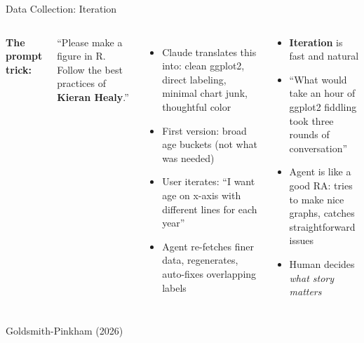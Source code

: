 \documentclass[aspectratio=169, 11pt]{beamer}
\newcommand{\emphgold}[1]{\alert{\textbf{#1}}}
\newcommand{\sourceref}[1]{\vspace{0.15cm}\hfill{\tiny\textcolor{medgray}{#1}}}
\begin{document}
\begin{frame}[shrink=6]{Data Collection: Iteration}
\begin{columns}[T]
\textbf{The prompt trick:}
\begin{codeblock}
\small
``Please make a figure in R. Follow the best practices of \emphgold{Kieran Healy}.''
\end{codeblock}
\vspace{0.1cm}
\begin{itemize}
  \item Claude translates this into: clean ggplot2, direct labeling, minimal chart junk, thoughtful color
  \item First version: broad age buckets (not what was needed)
  \item User iterates: ``I want age on x-axis with different lines for each year''
  \item Agent re-fetches finer data, regenerates, auto-fixes overlapping labels
\end{itemize}

\vspace{0.3cm}
\begin{keyinsight}
\begin{itemize}
  \item \emphgold{Iteration} is fast and natural
  \item ``What would take an hour of ggplot2 fiddling took three rounds of conversation''
  \item Agent is like a good RA: tries to make nice graphs, catches straightforward issues
  \item Human decides \emph{what story matters}
\end{itemize}
\end{keyinsight}
\end{columns}
\sourceref{Goldsmith-Pinkham (2026)}
\end{frame}
\end{document}
